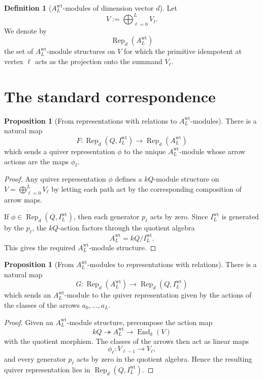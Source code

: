 \documentclass{article}
\newcommand{\Rep}{\operatorname{Rep}}
\newcommand{\End}{\operatorname{End}}
\theoremstyle{definition}
\newtheorem{proposition}[theorem]{Proposition}
\newtheorem{definition}[theorem]{Definition}
\begin{document}
\begin{definition}[$A_L^{\mathrm{wt}}$-modules of dimension vector $d$]
Let
\[
V:=\bigoplus_{\ell=0}^L V_\ell.
\]
We denote by
\[
\Rep_d(A_L^{\mathrm{wt}})
\]
the set of $A_L^{\mathrm{wt}}$-module structures on $V$ for which the primitive
idempotent at vertex $\ell$ acts as the projection onto the summand $V_\ell$.
\end{definition}

\section{The standard correspondence}

\begin{proposition}[From representations with relations to $A_L^{\mathrm{wt}}$-modules]
There is a natural map
\[
F:\Rep_d(Q,I_L^{\mathrm{wt}})\to \Rep_d(A_L^{\mathrm{wt}})
\]
which sends a quiver representation $\phi$ to the unique
$A_L^{\mathrm{wt}}$-module whose arrow actions are the maps $\phi_\ell$.
\end{proposition}

\begin{proof}
Any quiver representation $\phi$ defines a $kQ$-module structure on
$V=\bigoplus_{\ell=0}^L V_\ell$ by letting each path act by the corresponding
composition of arrow maps.

If $\phi\in \Rep_d(Q,I_L^{\mathrm{wt}})$, then each generator $p_\ell$ acts by
zero. Since $I_L^{\mathrm{wt}}$ is generated by the $p_\ell$, the $kQ$-action
factors through the quotient algebra
\[
A_L^{\mathrm{wt}}=kQ/I_L^{\mathrm{wt}}.
\]
This gives the required $A_L^{\mathrm{wt}}$-module structure.
\end{proof}

\begin{proposition}[From $A_L^{\mathrm{wt}}$-modules to representations with relations]
There is a natural map
\[
G:\Rep_d(A_L^{\mathrm{wt}})\to \Rep_d(Q,I_L^{\mathrm{wt}})
\]
which sends an $A_L^{\mathrm{wt}}$-module to the quiver representation given by
the actions of the classes of the arrows $a_0,\dots,a_L$.
\end{proposition}

\begin{proof}
Given an $A_L^{\mathrm{wt}}$-module structure, precompose the action map
\[
kQ\twoheadrightarrow A_L^{\mathrm{wt}}\to \End_k(V)
\]
with the quotient morphism.
The classes of the arrows then act as linear maps
\[
\phi_\ell:V_{\ell-1}\to V_\ell,
\]
and every generator $p_\ell$ acts by zero in the quotient algebra. Hence the
resulting quiver representation lies in $\Rep_d(Q,I_L^{\mathrm{wt}})$.
\end{proof}
\end{document}
